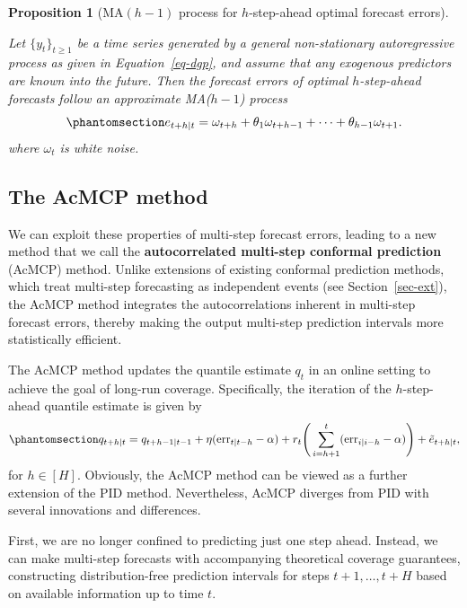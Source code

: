 \documentclass[
  11pt,
  a4paper,
]{article}
\theoremstyle{plain}
\newtheorem{proposition}{Proposition}[section]
\theoremstyle{remark}
\begin{document}
\begin{proposition}[MA\((h-1)\) process for \(h\)-step-ahead optimal
forecast errors]\protect\hypertarget{prp-ma}{}\label{prp-ma}

Let \(\{y_t\}_{t \geq 1}\) be a time series generated by a general
non-stationary autoregressive process as given in Equation~\ref{eq-dgp},
and assume that any exogenous predictors are known into the future. Then
the forecast errors of optimal \(h\)-step-ahead forecasts follow an
approximate MA(\(h-1\)) process
\begin{equation}\phantomsection\label{eq-ma}{
e_{t+h|t} = \omega_{t+h} + \theta_1\omega_{t+h-1} + \cdots + \theta_{h-1}\omega_{t+1}.
}\end{equation} where \(\omega_{t}\) is white noise.

\end{proposition}

\subsection{The AcMCP method}\label{sec-novel}

We can exploit these properties of multi-step forecast errors, leading
to a new method that we call the \textbf{autocorrelated multi-step
conformal prediction} (AcMCP) method. Unlike extensions of existing
conformal prediction methods, which treat multi-step forecasting as
independent events (see Section~\ref{sec-ext}), the AcMCP method
integrates the autocorrelations inherent in multi-step forecast errors,
thereby making the output multi-step prediction intervals more
statistically efficient.

The AcMCP method updates the quantile estimate \(q_t\) in an online
setting to achieve the goal of long-run coverage. Specifically, the
iteration of the \(h\)-step-ahead quantile estimate is given by
\begin{equation}\phantomsection\label{eq-acmcp}{
q_{t+h|t}=q_{t+h-1|t-1}+\eta (\mathrm{err}_{t|t-h}-\alpha)+r_t\Bigg(\sum_{i=h+1}^t (\mathrm{err}_{i|i-h}-\alpha)\Bigg)+\tilde{e}_{t+h|t},
}\end{equation} for \(h\in[H]\). Obviously, the AcMCP method can be
viewed as a further extension of the PID method. Nevertheless, AcMCP
diverges from PID with several innovations and differences.

First, we are no longer confined to predicting just one step ahead.
Instead, we can make multi-step forecasts with accompanying theoretical
coverage guarantees, constructing distribution-free prediction intervals
for steps \(t+1,\ldots,t+H\) based on available information up to time
\(t\).
\end{document}
